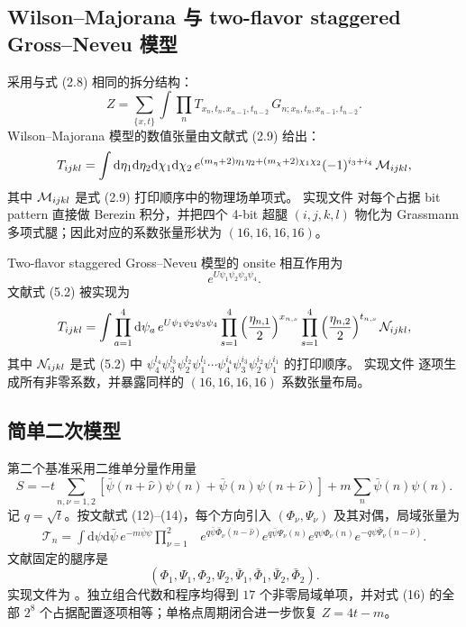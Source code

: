 \documentclass[UTF8,11pt]{ctexart}
\newcommand{\dd}{\mathrm{d}}
\newcommand{\cT}{\mathcal{T}}
\begin{document}
\subsection{Wilson--Majorana 与 two-flavor staggered Gross--Neveu 模型}
 采用与式 (2.8) 相同的拆分结构：
\begin{equation}
 Z=\sum_{\{x,t\}}\int\prod_n
 T_{x_n,t_n,x_{n-\hat1},t_{n-\hat2}}\,
 G_{n;x_n,t_n,x_{n-\hat1},t_{n-\hat2}} .
\end{equation}
Wilson--Majorana 模型的数值张量由文献式 (2.9) 给出：
\begin{equation}
 T_{ijkl}=\int \dd\eta_1\dd\eta_2\dd\chi_1\dd\chi_2\,
 e^{(m_\eta+2)\eta_1\eta_2+(m_\chi+2)\chi_1\chi_2}
 (-1)^{i_3+i_4}\,{\cal M}_{ijkl},
\end{equation}
其中 ${\cal M}_{ijkl}$ 是式 (2.9) 打印顺序中的物理场单项式。
实现文件  对每个占据 bit pattern 直接做 Berezin 积分，并把四个 4-bit 超腿
\((i,j,k,l)\) 物化为 Grassmann 多项式腿；因此对应的系数张量形状为
\((16,16,16,16)\)。

Two-flavor staggered Gross--Neveu 模型的 onsite 相互作用为
\begin{equation}
 e^{U\psi_1\psi_2\psi_3\psi_4}.
\end{equation}
文献式 (5.2) 被实现为
\begin{equation}
 T_{ijkl}=\int\prod_{a=1}^4\dd\psi_a\,
 e^{U\psi_1\psi_2\psi_3\psi_4}
 \prod_{s=1}^4\left(\frac{\eta_{n,1}}2\right)^{x_{n,s}}
 \prod_{s=1}^4\left(\frac{\eta_{n,2}}2\right)^{t_{n,s}}
 {\cal N}_{ijkl},
\end{equation}
其中 ${\cal N}_{ijkl}$ 是式 (5.2) 中
\(\psi_4^{l_4}\psi_3^{l_3}\psi_2^{l_2}\psi_1^{l_1}\cdots
\psi_4^{i_4}\psi_3^{i_3}\psi_2^{i_2}\psi_1^{i_1}\) 的打印顺序。
实现文件  逐项生成所有非零系数，并暴露同样的 \((16,16,16,16)\) 系数张量布局。

\subsection{简单二次模型}
第二个基准采用二维单分量作用量
\begin{equation}
 S=-t\sum_{n,\nu=1,2}
 \left[\bar\psi(n+\hat\nu)\psi(n)+
 \bar\psi(n)\psi(n+\hat\nu)\right]
 +m\sum_n\bar\psi(n)\psi(n).
\end{equation}
记 $q=\sqrt t$。按文献式 (12)--(14)，每个方向引入
$(\Phi_\nu,\Psi_\nu)$ 及其对偶，局域张量为
\begin{align}
 \cT_n=\int\dd\psi\dd\bar\psi\,e^{-m\bar\psi\psi}
 \prod_{\nu=1}^{2}&e^{q\bar\psi\bar\Phi_\nu(n-\hat\nu)}
 e^{q\bar\psi\Psi_\nu(n)}e^{q\psi\Phi_\nu(n)}
 e^{-q\psi\bar\Psi_\nu(n-\hat\nu)}.
\end{align}
文献固定的腿序是
\begin{equation}
 (\Phi_1,\Psi_1,\Phi_2,\Psi_2,
 \bar\Psi_1,\bar\Phi_1,\bar\Psi_2,\bar\Phi_2).
\end{equation}
实现文件为 。独立组合代数和程序均得到 $17$ 个非零局域单项，并对式 (16) 的全部 $2^8$ 个占据配置逐项相等；单格点周期闭合进一步恢复 $Z=4t-m$。
\end{document}
